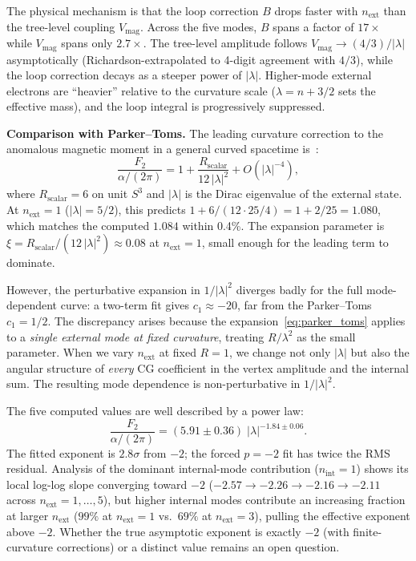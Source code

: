 \documentclass[11pt]{article}
\begin{document}
The physical mechanism is that the loop correction $B$ drops faster with
$n_{\mathrm{ext}}$ than the tree-level coupling $V_{\mathrm{mag}}$.
Across the five modes, $B$ spans a factor of $17\times$ while
$V_{\mathrm{mag}}$ spans only $2.7\times$.  The tree-level amplitude
follows $V_{\mathrm{mag}} \to (4/3)/|\lambda|$ asymptotically
(Richardson-extrapolated to 4-digit agreement with $4/3$), while
the loop correction decays as a steeper power of $|\lambda|$.
Higher-mode external electrons are ``heavier'' relative to the
curvature scale ($\lambda = n + 3/2$ sets the effective mass), and
the loop integral is progressively suppressed.

\medskip
\noindent\textbf{Comparison with Parker--Toms.}
The leading curvature correction to the anomalous magnetic moment in a
general curved spacetime is~\cite{parker1980}:
\begin{equation}
  \frac{F_2}{\alpha/(2\pi)} = 1 + \frac{R_{\mathrm{scalar}}}{12\,|\lambda|^2}
  + O(|\lambda|^{-4}),
  \label{eq:parker_toms}
\end{equation}
where $R_{\mathrm{scalar}} = 6$ on unit $S^3$ and $|\lambda|$ is the
Dirac eigenvalue of the external state.  At $n_{\mathrm{ext}} = 1$
($|\lambda| = 5/2$), this predicts $1 + 6/(12 \cdot 25/4) = 1 + 2/25
= 1.080$, which matches the computed $1.084$ within 0.4\%.  The
expansion parameter is
$\xi = R_{\mathrm{scalar}}/(12\,|\lambda|^2) \approx 0.08$ at
$n_{\mathrm{ext}} = 1$, small enough for the leading term to dominate.

However, the perturbative expansion in $1/|\lambda|^2$ diverges badly
for the full mode-dependent curve: a two-term fit gives
$c_1 \approx -20$, far from the Parker--Toms $c_1 = 1/2$.  The
discrepancy arises because the expansion~\eqref{eq:parker_toms} applies
to a \emph{single external mode at fixed curvature}, treating $R/\lambda^2$
as the small parameter.  When we vary $n_{\mathrm{ext}}$ at fixed $R = 1$,
we change not only $|\lambda|$ but also the angular structure of
\emph{every} CG coefficient in the vertex amplitude and the internal
sum.  The resulting mode dependence is non-perturbative in $1/|\lambda|^2$.

The five computed values are well described by a power law:
\begin{equation}
  \frac{F_2}{\alpha/(2\pi)} = (5.91 \pm 0.36)\;|\lambda|^{-1.84 \pm 0.06}.
  \label{eq:mode_power_law}
\end{equation}
The fitted exponent is $2.8\sigma$ from $-2$; the forced $p = -2$ fit
has twice the RMS residual.  Analysis of the dominant internal-mode
contribution ($n_{\mathrm{int}} = 1$) shows its local log-log slope
converging toward $-2$ ($-2.57 \to -2.26 \to -2.16 \to -2.11$ across
$n_{\mathrm{ext}} = 1, \ldots, 5$), but higher internal modes
contribute an increasing fraction at larger $n_{\mathrm{ext}}$
($99\%$ at $n_{\mathrm{ext}} = 1$ vs.\ $69\%$ at $n_{\mathrm{ext}} = 3$),
pulling the effective exponent above $-2$.  Whether the true asymptotic
exponent is exactly $-2$ (with finite-curvature corrections) or a
distinct value remains an open question.
\end{document}

